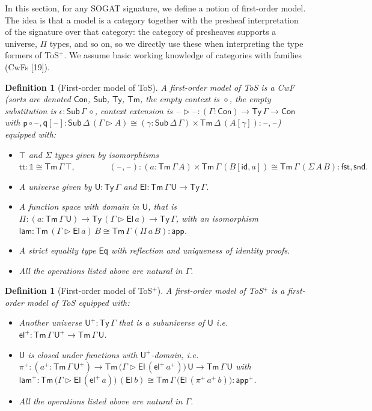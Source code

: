 \documentclass[10pt,a4paper]{amsart}
\newtheorem{definition}[theorem]{Definition}
\providecommand{\vmathbb}[1]{\mathbb{#1}}
\newcommand{\Ty}{\mathsf{Ty}}
\newcommand{\Tm}{\mathsf{Tm}}
\newcommand{\U}{\mathsf{U}}
\newcommand{\El}{\mathsf{El}}
\newcommand{\ra}{\rightarrow}
\newcommand{\blank}{\mathord{\hspace{1pt}\text{--}\hspace{1pt}}} %
\newcommand{\lam}{\mathsf{lam}}
\newcommand{\app}{\mathsf{app}}
\newcommand{\el}{\mathsf{el}}
\newcommand{\Con}{\mathsf{Con}}
\newcommand{\Sub}{\mathsf{Sub}}
\newcommand{\ext}{\operatorname{\triangleright}}
\newcommand{\p}{\mathsf{p}}
\newcommand{\q}{\mathsf{q}}
\newcommand{\id}{\mathsf{id}}
\newcommand{\Eq}{\mathsf{Eq}}
\newcommand{\fst}{\mathsf{fst}}
\newcommand{\snd}{\mathsf{snd}}
\renewcommand{\tt}{\mathsf{tt}}
\begin{document}
In this section, for any SOGAT signature, we define a notion of
first-order model. The idea is that a model is a category together
with the presheaf interpretation of the signature over that category:
the category of presheaves supports a universe, $\Pi$ types, and so
on, so we directly use these when interpreting the type formers of ToS$^+$.
We assume basic working knowledge of
categories with families (CwFs
[19]).
\begin{definition}[First-order model of ToS]\label{def:gat_gat}
  A first-order model of ToS is a CwF (sorts
  are denoted $\Con$, $\Sub$, $\Ty$, $\Tm$, the empty context is $\diamond$, the empty substitution is $\epsilon:\Sub\,\Gamma\,\diamond$, context extension is
  $\blank\ext\blank : (\Gamma:\Con)\ra\Ty\,\Gamma\ra\Con$ with $\p\circ\blank,\q[\blank] :
  \Sub\,\Delta\,(\Gamma\ext A) \cong
  (\gamma:\Sub\,\Delta\,\Gamma)\times\Tm\,\Delta\,(A[\gamma]) :
  \blank\mathbin{{,}}\blank$) equipped with:
  \begin{itemize}
  \item $\top$ and $\Sigma$ types given by isomorphisms \\
    $
    \tt : \vmathbb{1} \cong \Tm\,\Gamma\,\top, \hspace{4em} (\blank,\blank) : (a:\Tm\,\Gamma\,A)\times\Tm\,\Gamma\,(B[\id,a]) \cong \Tm\,\Gamma\,(\Sigma\,A\,B) : \fst,\snd.
    $
  \item A universe given by $\U : \Ty\,\Gamma$ and $\El : \Tm\,\Gamma\,\U\ra\Ty\,\Gamma$.
  \item A function space with domain in $\U$, that is
    $\Pi:(a:\Tm\,\Gamma\,\U)\ra\Ty\,(\Gamma\ext\El\,a)\ra\Ty\,\Gamma$,
    with an isomorphism $\lam : \Tm\,(\Gamma\ext\El\,a)\,B \cong 
    \Tm\,\Gamma\,(\Pi\,a\,B) : \app$.
  \item A strict equality type $\Eq$ with reflection and uniqueness of
    identity proofs.
  \item All the operations listed above are natural in $\Gamma$.
  \end{itemize}
\end{definition}
\begin{definition}[First-order model of ToS$^+$]\label{def:sogat_gat}
  A first-order model of ToS$^+$ is a
  first-order model of ToS equipped with:
  \begin{itemize}
  \item Another universe $\U^+ : \Ty\,\Gamma$ that is a subuniverse of
    $\U$ i.e.\ $\el^+:\Tm\,\Gamma\,\U^+\ra\Tm\,\Gamma\,\U$.
  \item $\U$ is closed under functions with $\U^+$-domain, i.e.\ 
    $\pi^+ :
    (a^+:\Tm\,\Gamma\,\U^+)\ra\Tm\,\big(\Gamma\ext\El\,(\el^+\,a^+)\big)\,\U\ra\Tm\,\Gamma\,\U$
    with $\lam^+ :
    \Tm\,\big(\Gamma\ext\El\,(\el^+\,a)\big)\,(\El\,b) \cong 
    \Tm\,\Gamma\,\big(\El\,(\pi^+\,a^+\,b)\big) : \app^+$.
  \item All the operations listed above are natural in $\Gamma$.
  \end{itemize}
\end{definition}
\end{document}
